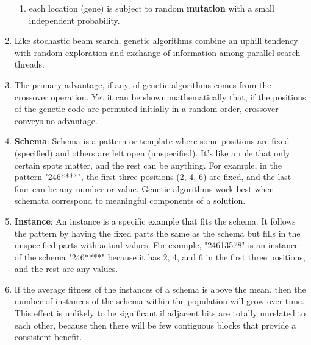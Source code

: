\begin{enumerate}
\begin{enumerate}
        \item each location (gene) is subject to random \textbf{mutation} with a small independent probability. 
        \hfill \cite{ai/book/Artificial-Intelligence-A-Modern-Approach/Russell-Norvig}
    \end{enumerate}

    \item Like stochastic beam search, genetic algorithms combine an uphill tendency with random exploration and exchange of information among parallel search threads.
    \hfill \cite{ai/book/Artificial-Intelligence-A-Modern-Approach/Russell-Norvig}

    \item The primary advantage, if any, of genetic algorithms comes from the crossover operation. 
    Yet it can be shown mathematically that, if the positions of the genetic code are permuted initially in a random order, crossover conveys no advantage. 
    \hfill \cite{ai/book/Artificial-Intelligence-A-Modern-Approach/Russell-Norvig}

    \item \textbf{Schema}: Schema is a pattern or template where some positions are fixed (specified) and others are left open (unspecified). 
    It's like a rule that only certain spots matter, and the rest can be anything. 
    For example, in the pattern "246****", the first three positions (2, 4, 6) are fixed, and the last four can be any number or value.
    Genetic algorithms work best when schemata correspond to meaningful components of a solution. 
    \hfill \cite{ai/book/Artificial-Intelligence-A-Modern-Approach/Russell-Norvig, common/online/chatgpt}

    \item \textbf{Instance}: An instance is a specific example that fits the schema. 
    It follows the pattern by having the fixed parts the same as the schema but fills in the unspecified parts with actual values. 
    For example, "24613578" is an instance of the schema "246****" because it has 2, 4, and 6 in the first three positions, and the rest are any values.
    \hfill \cite{ai/book/Artificial-Intelligence-A-Modern-Approach/Russell-Norvig, common/online/chatgpt}

    \item If the average fitness of the instances of a schema is above the mean, then the number of instances of the schema within the population will grow over time.
    This effect is unlikely to be significant if adjacent bits are totally unrelated to each other, because then there will be few contiguous blocks that provide a consistent benefit.
    \hfill \cite{ai/book/Artificial-Intelligence-A-Modern-Approach/Russell-Norvig}
\end{enumerate}




